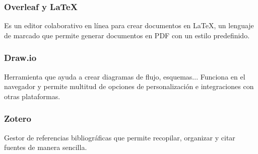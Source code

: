 \subsubsection{Overleaf y LaTeX}
\label{subsubsec:Overleaf}
Es un editor colaborativo en línea para crear documentos en LaTeX, un lenguaje de marcado que permite generar documentos en PDF con un estilo predefinido.

\subsubsection{Draw.io}
\label{subsubsec:Draw}
Herramienta que ayuda a crear diagramas de flujo, esquemas... Funciona en el navegador y permite multitud de opciones de personalización e integraciones con otras plataformas.

\subsubsection{Zotero}
\label{subsubsec:Zotero}
Gestor de referencias bibliográficas que permite recopilar, organizar y citar fuentes de manera sencilla.
